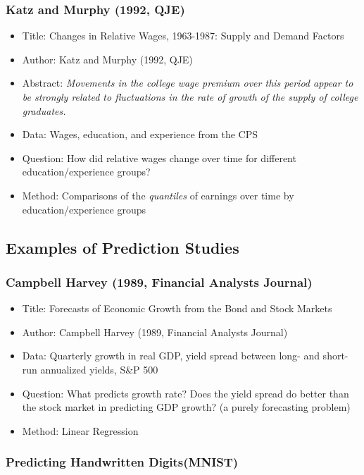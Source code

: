 \subsubsection{Katz and Murphy (1992, QJE)}

\begin{itemize}
    \item Title: Changes in Relative Wages, 1963-1987: Supply and Demand Factors
    \item Author: Katz and Murphy (1992, QJE)
    \item Abstract: \textit{Movements in the college wage premium over this period appear to be strongly related to fluctuations in the rate of growth of the supply of college graduates.}
    \item Data: Wages, education, and experience from the CPS
    \item Question: How did relative wages change over time for different education/experience groups?
    \item Method: Comparisons of the \textit{quantiles} of earnings over time by education/experience groups
\end{itemize}

\subsection{Examples of Prediction Studies}

\subsubsection{Campbell Harvey (1989, Financial Analysts Journal)}

\begin{itemize}
    \item Title: Forecasts of Economic Growth from the Bond and Stock Markets
    \item Author: Campbell Harvey (1989, Financial Analysts Journal)
    \item Data:  Quarterly growth in real GDP, yield spread between long- and short-run annualized yields, S\&P 500
    \item Question: What predicts growth rate? Does the yield spread do better than the stock market in predicting GDP growth? (a purely forecasting problem)
    \item Method: Linear Regression
\end{itemize}

\subsubsection{Predicting Handwritten Digits(MNIST)}

